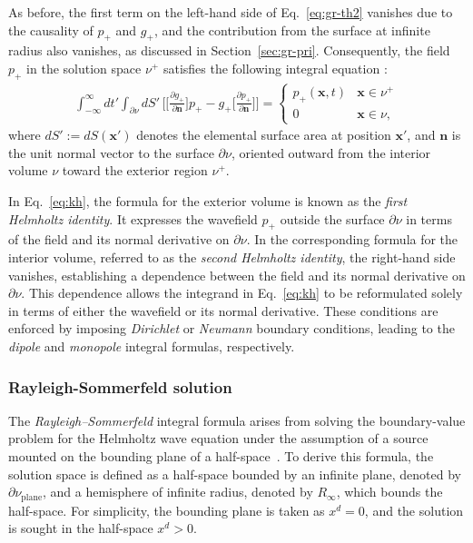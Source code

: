 \documentclass[11pt,reqno]{amsart}
\theoremstyle{remark}
\theoremstyle{italic_lemma}
\newcommand{\bx}{\boldsymbol{x}}
\newcommand{\bn}{\boldsymbol{n}}
\begin{document}
As before, the first term on the left-hand side of Eq.~\eqref{eq:gr-th2} vanishes due to the causality of $p_+$ and $g_+$, and the contribution from the surface at infinite radius also vanishes, as discussed in Section~\ref{sec:gr-pri}. Consequently, the field $p_+$ in the solution space $\nu^+$ satisfies the following integral equation \cite{Devaney}:
\begin{align}  \label{eq:kh}
    \int_{-\infty}^{\infty} dt' \int_{\partial \nu} dS' \, 
    \bigg[ 
       \big[   \frac{\partial g_+}{\partial \bn} \big] p_+ 
        - g_+  \big[ \frac{\partial p_+}{\partial \bn} \big]
    \bigg] =
    \begin{cases}
        p_+(\bx, t) & \bx \in \nu^+\\
        0 & \bx \in \nu,
    \end{cases}
\end{align}
where $dS' := dS(\bx')$ denotes the elemental surface area at position $\bx'$, and $\bn$ is the unit normal vector to the surface $\partial \nu$, oriented outward from the interior volume $\nu$ toward the exterior region $\nu^+$.

In Eq.~\eqref{eq:kh}, the formula for the exterior volume is known as the \textit{first Helmholtz identity}. It expresses the wavefield \( p_+ \) outside the surface \( \partial \nu \) in terms of the field and its normal derivative on \( \partial \nu \). In the corresponding formula for the interior volume, referred to as the \textit{second Helmholtz identity}, the right-hand side vanishes, establishing a dependence between the field and its normal derivative on \( \partial \nu \). This dependence allows the integrand in Eq.~\eqref{eq:kh} to be reformulated solely in terms of either the wavefield or its normal derivative. These conditions are enforced by imposing \textit{Dirichlet} or \textit{Neumann} boundary conditions, leading to the \textit{dipole} and \textit{monopole} integral formulas, respectively.



\subsubsection{Rayleigh-Sommerfeld solution} \label{sec:ray-som}

The \textit{Rayleigh--Sommerfeld} integral formula arises from solving the boundary-value problem for the Helmholtz wave equation under the assumption of a source mounted on the bounding plane of a half-space~\cite{Devaney}. To derive this formula, the solution space is defined as a half-space bounded by an infinite plane, denoted by \( \partial \nu_{\text{plane}} \), and a hemisphere of infinite radius, denoted by \( R_{\infty} \), which bounds the half-space. For simplicity, the bounding plane is taken as \( x^d = 0 \), and the solution is sought in the half-space \( x^d > 0 \).
\end{document}
